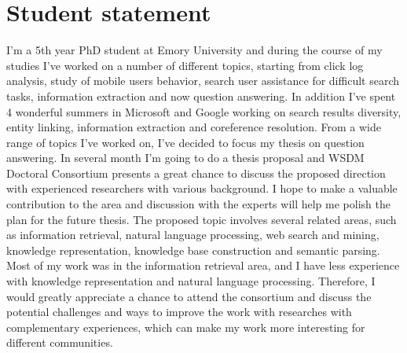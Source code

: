 \documentclass{sig-alternate}
\begin{document}
\section{Student statement}
I'm a 5th year PhD student at Emory University and during the course of my studies I've worked on a number of different topics, starting from click log analysis, study of mobile users behavior, search user assistance for difficult search tasks, information extraction and now question answering.
In addition I've spent 4 wonderful summers in Microsoft and Google working on search results diversity, entity linking, information extraction and coreference resolution.
From a wide range of topics I've worked on, I've decided to focus my thesis on question answering.
In several month I'm going to do a thesis proposal and WSDM Doctoral Consortium presents a great chance to discuss the proposed direction with experienced researchers with various background.
I hope to make a valuable contribution to the area and discussion with the experts will help me polish the plan for the future thesis.
The proposed topic involves several related areas, such as information retrieval, natural language processing, web search and mining, knowledge representation, knowledge base construction and semantic parsing.
Most of my work was in the information retrieval area, and I have less experience with knowledge representation and natural language processing.
Therefore, I would greatly appreciate a chance to attend the consortium and discuss the potential challenges and ways to improve the work with researches with complementary experiences, which can make my work more interesting for different communities.
\end{document}
